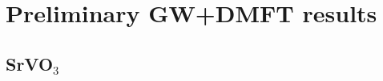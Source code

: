\documentclass[12pt,a4paper]{scrartcl}
\numberwithin{equation}{section}
\begin{document}

\clearpage

\section{Preliminary GW+DMFT results}
\subsection{SrVO$_3$}
\end{document}
